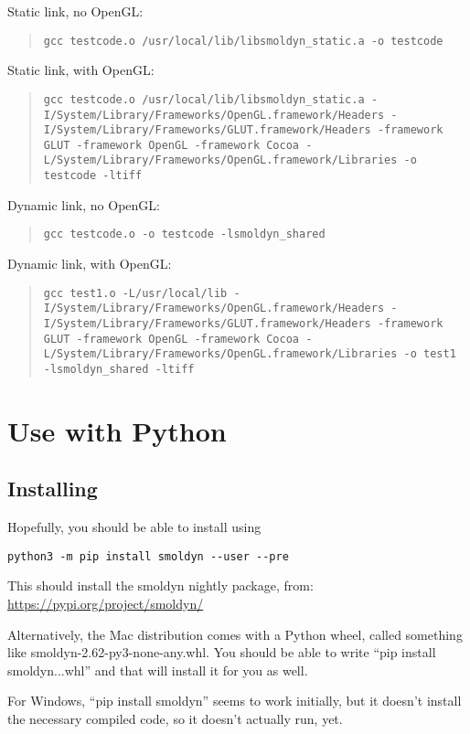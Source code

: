 \documentclass {book}
\begin{document}
Static link, no OpenGL:
\begin{quote}
\lstinline{gcc testcode.o /usr/local/lib/libsmoldyn_static.a -o testcode}
\end{quote}

Static link, with OpenGL:
\begin{quote}
\lstinline{gcc testcode.o /usr/local/lib/libsmoldyn_static.a -I/System/Library/Frameworks/OpenGL.framework/Headers -I/System/Library/Frameworks/GLUT.framework/Headers -framework GLUT -framework OpenGL -framework Cocoa -L/System/Library/Frameworks/OpenGL.framework/Libraries -o testcode -ltiff}
\end{quote}

Dynamic link, no OpenGL:
\begin{quote}
\lstinline{gcc testcode.o -o testcode -lsmoldyn_shared}
\end{quote}

Dynamic link, with OpenGL:
\begin{quote}
\lstinline{gcc test1.o -L/usr/local/lib -I/System/Library/Frameworks/OpenGL.framework/Headers -I/System/Library/Frameworks/GLUT.framework/Headers -framework GLUT -framework OpenGL -framework Cocoa -L/System/Library/Frameworks/OpenGL.framework/Libraries -o test1 -lsmoldyn_shared -ltiff}
\end{quote}


\chapter{Use with Python}

\section{Installing}

Hopefully, you should be able to install using
\begin{verbatim}
python3 -m pip install smoldyn --user --pre
\end{verbatim}
This should install the smoldyn nightly package, from: \url{https://pypi.org/project/smoldyn/}

Alternatively, the Mac distribution comes with a Python wheel, called something like smoldyn-2.62-py3-none-any.whl. You should be able to write ``pip install smoldyn...whl'' and that will install it for you as well.

For Windows, ``pip install smoldyn'' seems to work initially, but it doesn't install the necessary compiled code, so it doesn't actually run, yet.
\end{document}
